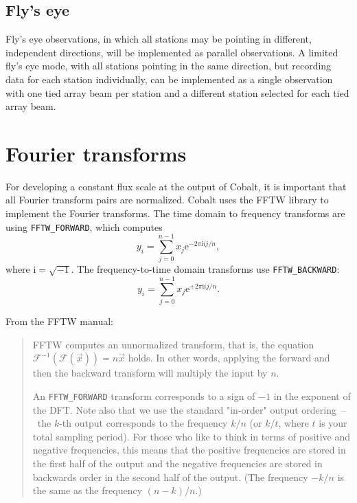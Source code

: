 \documentclass[a4paper,twoside]{article}
\newcommand{\cobalt}{Cobalt\xspace}
\newcommand{\fftwforward}{\texttt{FFTW\_FORWARD}\xspace}
\newcommand{\fftwbackward}{\texttt{FFTW\_BACKWARD}\xspace}
\begin{document}
\subsection{Fly's eye}

Fly's eye observations, in which all stations may be pointing in
different, independent directions, will be implemented as parallel
observations. A limited fly's eye mode, with all stations pointing in
the same direction, but recording data for each station individually,
can be implemented as a single observation with one tied array beam
per station and a different station selected for each tied array beam.




\section{Fourier transforms}

For developing a constant flux scale at the output of Cobalt, it is
important that all Fourier transform pairs are normalized. \cobalt
uses the FFTW library to implement the Fourier transforms. The time
domain to frequency transforms are using \fftwforward, which
computes
\begin{equation}
y_i = \sum_{j=0}^{n-1}x_j\mathrm{e}^{-2\pi\mathrm{i} i j / n},
\end{equation}
where $\mathrm{i} = \sqrt{-1}$. The frequency-to-time domain
transforms use \fftwbackward:
\begin{equation}
y_i = \sum_{j=0}^{n-1}x_j\mathrm{e}^{+2\pi\mathrm{i} i j / n}.
\end{equation}

From the FFTW manual:
\begin{quotation}

FFTW computes an unnormalized transform, that is, the equation
$\mathcal{F}^{-1}(\mathcal{F}(\vec{x})) = n \vec{x}$ holds. In other
words, applying the forward and then the backward transform will
multiply the input by $n$.

An \fftwforward transform corresponds to a sign of $-1$ in the exponent
of the DFT. Note also that we use the standard "in-order" output
ordering~--~the $k$-th output corresponds to the frequency $k/n$ (or $k/t$,
where $t$ is your total sampling period). For those who like to think in
terms of positive and negative frequencies, this means that the
positive frequencies are stored in the first half of the output and
the negative frequencies are stored in backwards order in the second
half of the output. (The frequency $-k/n$ is the same as the frequency
$(n-k)/n$.)
\end{quotation}
\end{document}
